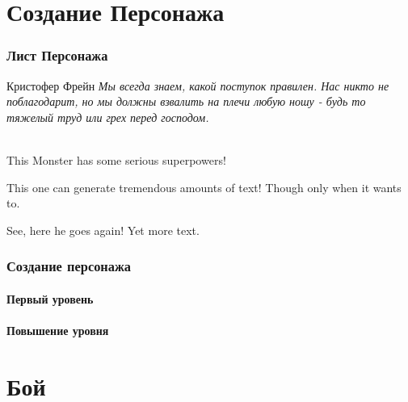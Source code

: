 \documentclass[10pt,twoside,twocolumn,openany]{book}
\begin{document}
\selectfont
\tableofcontents

\clearpage
\part{Создание Персонажа}
\onecolumn
\section{Лист Персонажа}
\begin{monsterbox}{Кристофер Фрейн}
	\textit{Мы всегда знаем, какой поступок правилен. Нас никто не поблагодарит, но мы должны взвалить 
	на плечи любую ношу - будь то тяжелый труд или грех перед господом.}\\
	\hline
	\stats[STR = \stat{8}, DEX = \stat{9}, CON = \stat{10}, INT = \stat{35}, WIT = \stat{38}, WIL = \stat{50}]
	\hline
	\basics[armorclass = 12, hitpoints = 16 (3d8+3), speed = 50 ft]
	\hline
	\details[languages = {Common Lisp, Erlang},]
	\hline \\[1mm]
	\begin{monsteraction}
		This Monster has some serious superpowers!
	\end{monsteraction}
	\begin{monsteraction}
		This one can generate tremendous amounts of text! Though only when it wants to.
	\end{monsteraction}
	\begin{monsteraction}
		See, here he goes again! Yet more text.
	\end{monsteraction}
\end{monsterbox}
\twocolumn
\clearpage

\section{Создание персонажа}
\lipsum[1]
\subsection{Первый уровень}
\lipsum[1]
\subsection{Повышение уровня}
\lipsum[1]

\part{Бой}
\end{document}

